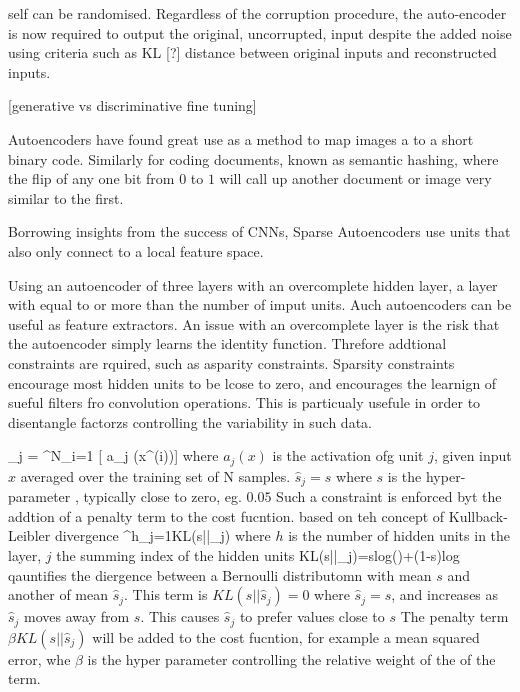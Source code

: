 self can be randomised.
Regardless of the corruption procedure, the auto-encoder is now required to output the original, uncorrupted, input despite the added noise using criteria such as KL [?] distance between original inputs and reconstructed inputs.

[generative vs discriminative fine tuning]\citep{mo2012survey}


Autoencoders have found great use as a method to map images a to a short binary code.
Similarly for coding documents, known as semantic hashing, where the flip of any one bit from $0$ to $1$ will call up another document or image very similar to the first.


Borrowing insights from the success of CNNs, Sparse Autoencoders use units that also only connect to a local feature space\citep{bengio2009advances}.

Using an autoencoder of three layers with an overcomplete hidden layer, a layer with equal to or more than the number of imput units.
Auch autoencoders can be useful as feature extractors\citep{payan2015predicting}.
An issue with an overcomplete layer is the risk that the autoencoder simply learns the identity function\citep{bengio2012practical}.
Threfore addtional constraints are rquired, such as asparity constraints\citep{poultney2006efficient}.
Sparsity constraints encourage most hidden units to be lcose to zero, and encourages the learnign of sueful filters fro convolution operations.
This is particualy usefule in order to disentangle factorzs controlling the variability in such data.

\be
{}_j = \sum^N_{i=1} [ a_j (x^{(i)})]
\ee
where $a_j(x)$ is the activation ofg unit $j$, given input $x$ averaged over the training set of N samples.
$\hat{s}_j =s$ where $s$ is the hyper-parameter , typically close to zero, eg. $0.05$
Such a constraint is enforced byt the addtion of a penalty term to the cost fucntion. based on teh concept of Kullback-Leibler divergence
\be
\sum^h_{j=1}KL(s||_j)
\ee
where $h$ is the number of hidden units in the layer, $j$ the summing index of the hidden units
\be
KL(s||_j)=slog()+(1-s)log 
\ee
qauntifies the diergence between a Bernoulli distributomn with mean $s$ and another of mean $\hat{s}_j$.
This term is $KL(s||\hat{s}_j)=0$ where $\hat{s}_j=s$, and increases as $\hat{s}_j$ moves away from $s$.
This causes $\hat{s}_j$ to prefer values close to $s$
The penalty term $\beta KL(s||\hat{s}_j)$ will be added to the cost fucntion, for example a mean squared error, whe $\beta$ is the hyper parameter controlling the relative weight of the of the term\citep{payan2015predicting}.





